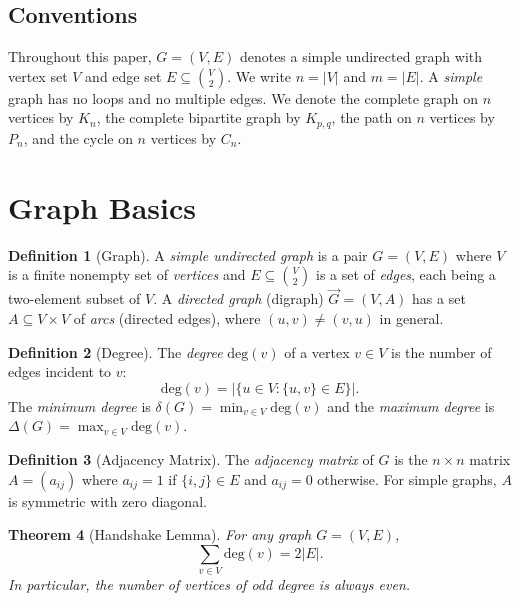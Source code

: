 \documentclass[12pt,a4paper]{amsart}
\newtheorem{theorem}{Theorem}[section]
\theoremstyle{definition}
\newtheorem{definition}[theorem]{Definition}
\theoremstyle{remark}
\newcommand{\degv}{\mathrm{deg}}
\begin{document}
\subsection*{Conventions}

Throughout this paper, $G = (V, E)$ denotes a simple undirected graph with
vertex set $V$ and edge set $E \subseteq \binom{V}{2}$. We write $n = |V|$
and $m = |E|$. A \emph{simple} graph has no loops and no multiple edges.
We denote the complete graph on $n$ vertices by $K_n$, the complete bipartite
graph by $K_{p,q}$, the path on $n$ vertices by $P_n$, and the cycle on $n$
vertices by $C_n$.

\section{Graph Basics}
\label{sec:basics}

\begin{definition}[Graph]
A \emph{simple undirected graph} is a pair $G = (V, E)$ where $V$ is a finite
nonempty set of \emph{vertices} and $E \subseteq \binom{V}{2}$ is a set of
\emph{edges}, each being a two-element subset of $V$. A \emph{directed graph}
(digraph) $\vec{G} = (V, A)$ has a set $A \subseteq V \times V$ of
\emph{arcs} (directed edges), where $(u, v) \ne (v, u)$ in general.
\end{definition}

\begin{definition}[Degree]
The \emph{degree} $\degv(v)$ of a vertex $v \in V$ is the number of edges
incident to $v$:
\[
  \degv(v) = |\{u \in V : \{u,v\} \in E\}|.
\]
The \emph{minimum degree} is $\delta(G) = \min_{v \in V} \degv(v)$ and the
\emph{maximum degree} is $\Delta(G) = \max_{v \in V} \degv(v)$.
\end{definition}

\begin{definition}[Adjacency Matrix]
The \emph{adjacency matrix} of $G$ is the $n \times n$ matrix $A = (a_{ij})$
where $a_{ij} = 1$ if $\{i,j\} \in E$ and $a_{ij} = 0$ otherwise. For
simple graphs, $A$ is symmetric with zero diagonal.
\end{definition}

\begin{theorem}[Handshake Lemma]
\label{thm:handshake}
For any graph $G = (V, E)$,
\[
  \sum_{v \in V} \degv(v) = 2|E|.
\]
In particular, the number of vertices of odd degree is always even.
\end{theorem}
\end{document}
